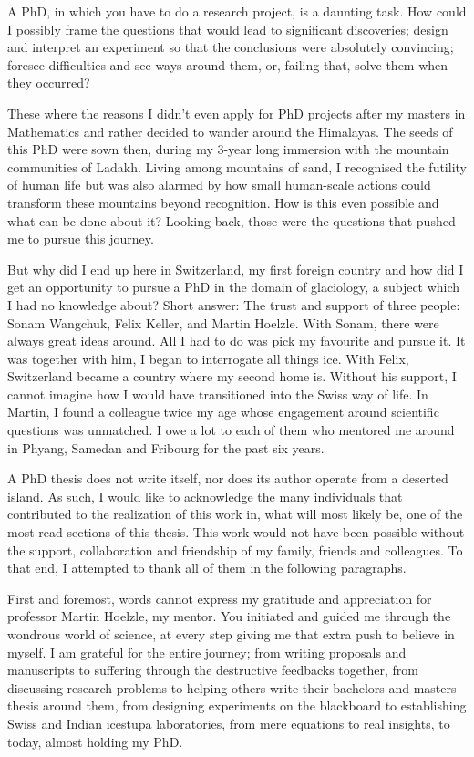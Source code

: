 %
\label{sec:acknowledgement}

A PhD, in which you have to do a research project, is a daunting task. How could I possibly frame the questions
that would lead to significant discoveries; design and interpret an experiment so that the conclusions were
absolutely convincing; foresee difficulties and see ways around them, or, failing that, solve them when they
occurred?

These where the reasons I didn't even apply for PhD projects after my masters in Mathematics and rather decided
to wander around the Himalayas. The seeds of this PhD were sown then, during my 3-year long immersion with the
mountain communities of Ladakh. Living among mountains of sand, I recognised the futility of human life but was
also alarmed by how small human-scale actions could transform these mountains beyond recognition. How is this
even possible and what can be done about it? Looking back, those were the questions that pushed me to pursue
this journey. 

But why did I end up here in Switzerland, my first foreign country and how did I get an opportunity to pursue a
PhD in the domain of glaciology, a subject which I had no knowledge about? Short answer: The trust and support
of three people: Sonam Wangchuk, Felix Keller, and Martin Hoelzle. With Sonam, there were always great ideas
around. All I had to do was pick my favourite and pursue it. It was together with him, I began to interrogate
all things ice.  With Felix, Switzerland became a country where my second home is. Without his support, I cannot
imagine how I would have transitioned into the Swiss way of life. In Martin, I found a colleague twice my age
whose engagement around scientific questions was unmatched. I owe a lot to each of them who mentored me around
in Phyang, Samedan and Fribourg for the past six years.

A PhD thesis does not write itself, nor does its author operate from a deserted island. As such, I would like to
acknowledge the many individuals that contributed to the realization of this work in, what will most likely be,
one of the most read sections of this thesis. This work would not have been possible without the support,
collaboration and friendship of my family, friends and colleagues. To that end, I attempted to thank all of them
in the following paragraphs.

First and foremost, words cannot express my gratitude and appreciation for professor Martin Hoelzle, my mentor.
You initiated and guided me through the wondrous world of science, at every step giving me that extra push to
believe in myself. I am grateful for the entire journey; from writing proposals and manuscripts to suffering
through the destructive feedbacks together, from discussing research problems to helping others write their
bachelors and masters thesis around them, from designing experiments on the blackboard to establishing Swiss and
Indian icestupa laboratories, from mere equations to real insights, to today, almost holding my PhD.

